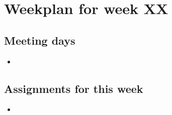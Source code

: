 \section{Weekplan for week XX}
\subsection{Meeting days}
\begin{itemize}
\item 
\end{itemize}

\subsection{Assignments for this week}
\begin{itemize}
\item
\end{itemize}